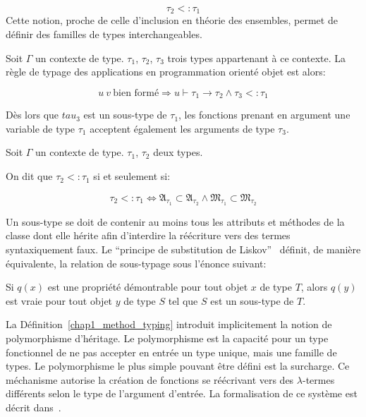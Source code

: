 \begin{equation}
  \tau_2 <: \tau_1
\end{equation}
%
%
Cette notion, proche de celle d'inclusion en théorie des ensembles,
permet de définir des familles de types interchangeables.
%
%
\begin{mydef}\label{chap1_oo_app}
  Soit $\Gamma$ un contexte de type. $\tau_1$, $\tau_2$, $\tau_3$
  trois types appartenant à ce contexte. La règle de typage des
  applications en programmation orienté objet est alors:


  \begin{equation}
    u~v~\text{bien formé} \Rightarrow u \vdash \tau_1 \rightarrow
    \tau_2 \wedge \tau_3 <: \tau_1
  \end{equation}

  Dès lors que $tau_3$ est un sous-type de $\tau_1$, les fonctions
  prenant en argument une variable de type $\tau_1$ acceptent
  également les arguments de type $\tau_3$.
\end{mydef}
%
\begin{mydef}\label{chap1_method_typing}
  Soit $\Gamma$ un contexte de type. $\tau_1$, $\tau_2$ deux types.

  On dit que $\tau_2 <: \tau_1$ si et seulement si:

  \begin{equation}
    \tau_2 <: \tau_1 \Longleftrightarrow \mathfrak{A_{\tau_1}} \subset
    \mathfrak{A_{\tau_2}} \wedge \mathfrak{M_{\tau_1}} \subset
    \mathfrak{M_{\tau_2}}
  \end{equation}
\end{mydef}
%
Un sous-type se doit de contenir au moins tous les attributs et
méthodes de la classe dont elle hérite afin d'interdire la réécriture
vers des termes syntaxiquement faux. Le ``principe de substitution de
Liskov''~\citep{Liskov94familyvalues} définit, de manière équivalente,
la relation de sous-typage sous l'énonce suivant:
%
\begin{mydef}\label{chap1_liskov}
  Si $q(x)$ est une propriété démontrable pour tout objet $x$ de type
  $T$, alors $q(y)$ est vraie pour tout objet $y$ de type $S$ tel que
  $S$ est un sous-type de $T$.
\end{mydef}


La Définition~\ref{chap1_method_typing} introduit implicitement la
notion de polymorphisme d'héritage. Le polymorphisme est la capacité
pour un type fonctionnel de ne pas accepter en entrée un type unique,
mais une famille de types. Le polymorphisme le plus simple pouvant
être défini est la surcharge. Ce méchanisme autorise
la création de fonctions se réécrivant vers des $\lambda$-termes
différents selon le type de l'argument d'entrée. La formalisation de
ce système est décrit dans~\citep{Castagna95acalculus}.

